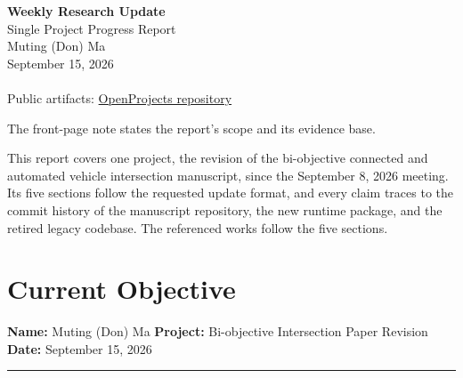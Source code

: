 \documentclass[10pt]{article}
\newcommand{\projectline}[1]{%
  {\small\noindent\textbf{Name:} Muting (Don) Ma\hfill
    \textbf{Project:} #1\hfill
    \textbf{Date:} September 15, 2026\par}
  \vspace{0.18em}\hrule\vspace{0.42em}}
\begin{document}
\hypersetup{pageanchor=false}
\begin{titlepage}
\thispagestyle{empty}
\vspace*{0.16\textheight}
\begin{center}
  {\Huge\bfseries\textcolor{uablue}{Weekly Research Update}}\\[0.8em]
  {\Large Single Project Progress Report}\\[2.2em]
  {\large Muting (Don) Ma}\\[0.45em]
  {\large September 15, 2026}\\[3em]
  \\[3em]
  \small Public artifacts:
  \href{https://github.com/mutingma123/OpenProjects}{OpenProjects repository}

  \vspace{2.2em}
  \sumpara The front-page note states the report's scope and its evidence base. \sumparaend
  \parbox{0.80\textwidth}{\small\centering
    \fin This report covers one project, the revision of the bi-objective connected and automated vehicle intersection manuscript, since the September 8, 2026 meeting. \fine
    \fin Its five sections follow the requested update format, and every claim traces to the commit history of the manuscript repository, the new runtime package, and the retired legacy codebase. \fine
    \fin The referenced works follow the five sections. \fine}
\end{center}
\end{titlepage}
\hypersetup{pageanchor=true}

\clearpage
{}
\setcounter{page}{1}
\tableofcontents
\clearpage

\setcounter{page}{1}

\section{Current Objective}
\label{sec:objective}
\projectline{Bi-objective Intersection Paper Revision}
\end{document}
